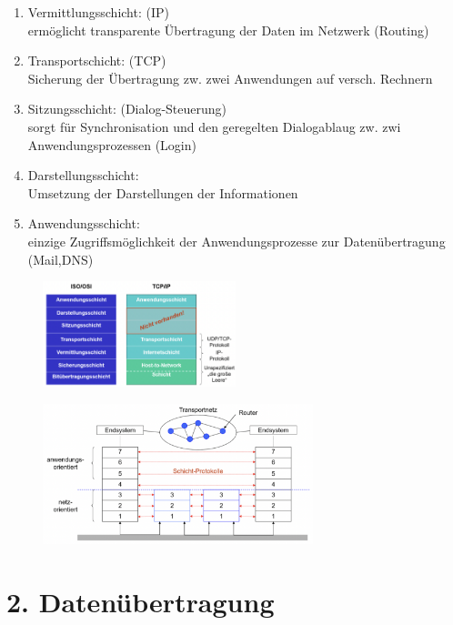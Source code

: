 \documentclass{scrreprt}
\begin{document}
\begin{itemize}
\begin{enumerate}
		\item Vermittlungsschicht: (IP)
		\\ermöglicht transparente Übertragung der Daten im Netzwerk (Routing)
		\item Transportschicht: (TCP)
		\\Sicherung der Übertragung zw. zwei Anwendungen auf versch. Rechnern
		\item Sitzungsschicht: (Dialog-Steuerung)
		\\sorgt für Synchronisation und den geregelten Dialogablaug zw. zwi Anwendungsprozessen (Login)
		\item Darstellungsschicht: 
		\\Umsetzung der Darstellungen der Informationen
		\item Anwendungsschicht:
		\\einzige Zugriffsmöglichkeit der Anwendungsprozesse zur Datenübertragung (Mail,DNS)
	\end{enumerate}
	\begin{figure}[h]
		\includegraphics[width=0.50\textwidth]{"graphics/IOSTCP"}
		\centering
	\end{figure}
	\begin{figure}[h]
		\includegraphics[width=0.70\textwidth]{"graphics/ISO2"}
		\centering
	\end{figure}
\end{itemize}

\section*{2. Datenübertragung}
\end{document}
